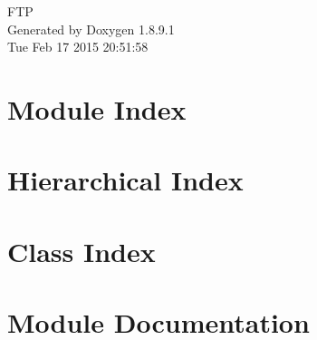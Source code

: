 \documentclass[twoside]{book}
\newcommand{\+}{\discretionary{\mbox{\scriptsize$\hookleftarrow$}}{}{}}
\newcommand{\clearemptydoublepage}{%
  \newpage{\pagestyle{empty}\cleardoublepage}%
}
\begin{document}
\hypersetup{pageanchor=false,
             bookmarks=true,
             bookmarksnumbered=true,
             pdfencoding=unicode
            }
\begin{titlepage}
\vspace*{7cm}
\begin{center}%
{\Large F\+T\+P }\\
\vspace*{1cm}
{\large Generated by Doxygen 1.8.9.1}\\
\vspace*{0.5cm}
{\small Tue Feb 17 2015 20:51:58}\\
\end{center}
\end{titlepage}
\clearemptydoublepage
\tableofcontents
\clearemptydoublepage
{}
\hypersetup{pageanchor=true}

\chapter{Module Index}

\chapter{Hierarchical Index}

\chapter{Class Index}

\chapter{Module Documentation}





\end{document}
